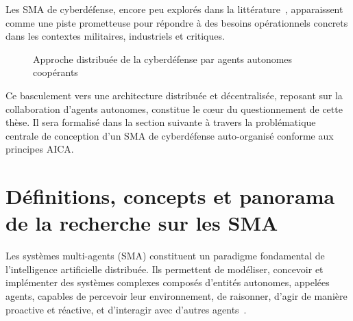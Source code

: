\documentclass[ twoside,openright,titlepage,numbers=noenddot,headinclude,%
                footinclude=true,cleardoublepage=empty,abstractoff, %
                BCOR=5mm,paper=a4,fontsize=11pt,%
                french,american,%
                ]{scrreprt}
\begin{document}
Les SMA de cyberdéfense, encore peu explorés dans la littérature~\cite{CyberResilienceFundamentals, AutonomousCyberDefenseSurvey2023}, apparaissent comme une piste prometteuse pour répondre à des besoins opérationnels concrets dans les contextes militaires, industriels et critiques.

\begin{figure}[h]
    \centering
    \caption{Approche distribuée de la cyberdéfense par agents autonomes coopérants}
    \label{fig:distributed_sma}
\end{figure}

Ce basculement vers une architecture distribuée et décentralisée, reposant sur la collaboration d'agents autonomes, constitue le cœur du questionnement de cette thèse. Il sera formalisé dans la section suivante à travers la problématique centrale de conception d'un SMA de cyberdéfense auto-organisé conforme aux principes AICA.


\section{Définitions, concepts et panorama de la recherche sur les SMA}\label{sec:sma-concepts}


Les systèmes multi-agents (SMA) constituent un paradigme fondamental de l'intelligence artificielle distribuée. Ils permettent de modéliser, concevoir et implémenter des systèmes complexes composés d'entités autonomes, appelées agents, capables de percevoir leur environnement, de raisonner, d'agir de manière proactive et réactive, et d'interagir avec d'autres agents~\cite{Ferber1999, Wooldridge2009}.
\end{document}
